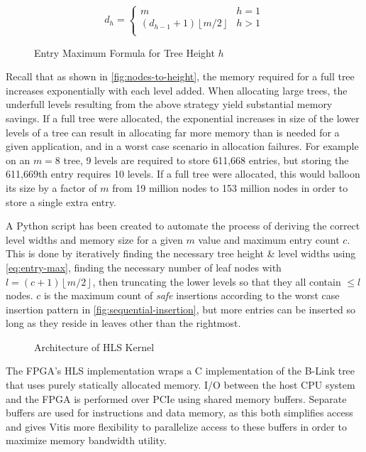 \begin{figure}[h]
	\centering
	\ssp
	\begin{equation}
		d_h = \begin{cases}
			m & h = 1 \\
			(d_{h-1}+1)\left\lfloor{m/2}\right\rfloor & h > 1 \\
		\end{cases}
		\label{eq:entry-max}
	\end{equation}
	\caption*{Entry Maximum Formula for Tree Height $h$}
\end{figure}

Recall that as shown in \autoref{fig:nodes-to-height}, the memory required for a
full tree increases exponentially with each level added. When allocating large
trees, the underfull levels resulting from the above strategy yield substantial
memory savings. If a full tree were allocated, the exponential increases in size
of the lower levels of a tree can result in allocating far more memory than is
needed for a given application, and in a worst case scenario in allocation
failures.
%
For example on an $m=8$ tree, 9 levels are required to store 611,668 entries,
but storing the 611,669th entry requires 10 levels. If a full tree were
allocated, this would balloon its size by a factor of $m$ from 19 million nodes
to 153 million nodes in order to store a single extra entry.

A Python script has been created to automate the process of deriving the correct
level widths and memory size for a given $m$ value and maximum entry count $c$.
%
This is done by iteratively finding the necessary tree height \& level widths
using \autoref{eq:entry-max}, finding the necessary number of leaf nodes with
$l=(c+1)\left\lfloor{m/2}\right\rfloor$, then truncating the lower levels so
that they all contain $\leq l$ nodes.
%
$c$ is the maximum count of \emph{safe} insertions according to the worst case
insertion pattern in \autoref{fig:sequential-insertion}, but more entries can be
inserted so long as they reside in leaves other than the rightmost.


\label{subsec:fpga-implementation}

\begin{figure}[H]
	\centering
	
	\caption{Architecture of HLS Kernel}
	\label{fig:hls-arch}
\end{figure}

The FPGA's HLS implementation wraps a C implementation of the B-Link tree that
uses purely statically allocated memory. I/O between the host CPU system and the
FPGA is performed over PCIe using shared memory buffers. Separate buffers are
used for instructions and data memory, as this both simplifies access and gives
Vitis more flexibility to parallelize access to these buffers in order to
maximize memory bandwidth utility.


